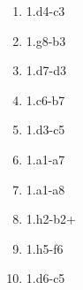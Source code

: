 \begin{enumerate}
\setcounter{enumi}{\value{d_counter}}
\item 1.\king{}d4-c3
\item 1.\bishop{}g8-b3
\item 1.\rook{}d7-d3
\item 1.\king{}c6-b7
\item 1.\knight{}d3-c5
\item 1.\rook{}a1-a7

\item 1.\rook{}a1-a8
\item 1.\rook{}h2-b2+
\item 1.\knight{}h5-f6
\item 1.\bishop{}d6-c5
\setcounter{d_counter}{\value{enumi}}
\end{enumerate}